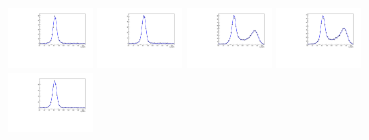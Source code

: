 \begin{figure}[htbp]
  \centering
  \includegraphics[width=0.2\textwidth]{fig/2Dfit/LNuJJ_res_MJJ_mu_HP_nobb_LDy.pdf}
  \includegraphics[width=0.2\textwidth]{fig/2Dfit/LNuJJ_res_MJJ_e_HP_nobb_LDy.pdf}
  \includegraphics[width=0.2\textwidth]{fig/2Dfit/LNuJJ_res_MJJ_mu_LP_nobb_LDy.pdf}
  \includegraphics[width=0.2\textwidth]{fig/2Dfit/LNuJJ_res_MJJ_e_LP_nobb_LDy.pdf}\\
  \includegraphics[width=0.2\textwidth]{fig/2Dfit/LNuJJ_res_MJJ_mu_HP_nobb_HDy.pdf}

\end{figure}
